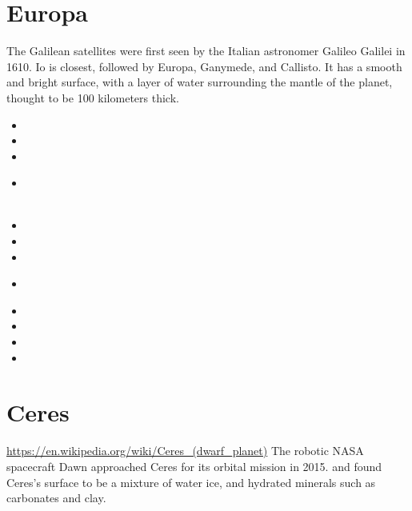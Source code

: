 \section{Europa}

The Galilean satellites were first seen by the Italian astronomer 
Galileo Galilei in 1610. Io is closest, followed by Europa, Ganymede, 
and Callisto. It has a smooth and bright surface, with a layer of 
water surrounding the mantle of the planet, thought to be 100 kilometers thick.

\begin{small}
\begin{itemize}
\item[1986]
\item[\twothousandtwo] 
\item[\twothousandfour] 
\item[\twothousandfive] 
\\ 
\\ 
\item[\twothousandeight] 
\item[\twothousandten] 
\item[\twothousandeleven] 
\item[\twothousandfourteen] 
 \\
\item[\twothousandnineteen] 
\item[\twothousandtwentyone] 
\item[\twothousandtwentytwo] 
\item[2025]
\end{itemize}
\end{small}



\section{Ceres}

\url{https://en.wikipedia.org/wiki/Ceres_(dwarf_planet)}
The robotic NASA spacecraft Dawn approached Ceres for its orbital mission in 2015.
and found Ceres's surface to be a mixture of water ice, and hydrated minerals such as carbonates and clay. 


